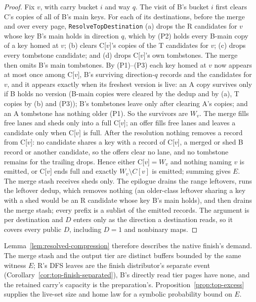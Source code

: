 \documentclass[11pt]{article}
\theoremstyle{definition}
\theoremstyle{remark}
\begin{document}
\begin{proof}
Fix $v$, with carry bucket $i$ and way $q$. The visit of B's bucket $i$
first clears C's copies of all of B's main keys. For each of its
destinations, before the merge and over every page,
\texttt{ResolveTopDestination} (a) drops the R candidates for $v$ whose key
B's main holds in direction $q$, which by (P2) holds every B-main copy of a
key homed at $v$; (b) clears C[$v$]'s copies of the T candidates for $v$;
(c) drops every tombstone candidate; and (d) drops C[$v$]'s own tombstones.
The merge then omits B's main tombstones. By (P1)--(P3) each key homed at
$v$ now appears at most once among C[$v$], B's surviving direction-$q$
records and the candidates for $v$, and it appears exactly when its
freshest version is live: an A copy survives only if B holds no version
(B-main copies were cleared by the dedup and by (a), T copies by (b) and
(P3)); B's tombstones leave only after clearing A's copies; and an A
tombstone has nothing older (P1). So the survivors are $W_v$. The merge
fills free lanes and sheds only into a full C[$v$]; an offer fills free
lanes and leaves a candidate only when C[$v$] is full. After the resolution
nothing removes a record from C[$v$]: no candidate shares a key with a
record of C[$v$], a merged or shed B record or another candidate, so the
offers clear no lane, and no tombstone remains for the trailing drops.
Hence either C[$v$]$=W_v$ and nothing naming $v$ is emitted, or C[$v$] ends
full and exactly $W_v\setminus C[v]$ is emitted; summing gives $E$. The
merge stash receives sheds only. The epilogue drains the range leftovers,
runs the leftover dedup, which removes nothing (an older-class leftover
sharing a key with a shed would be an R candidate whose key B's main
holds), and then drains the merge stash; every prefix is a sublist of the
emitted records. The argument is per destination and $D$ enters only as the
direction a destination reads, so it covers every public $D$, including
$D=1$ and nonbinary maps.
\end{proof}
Lemma~\ref{lem:resolved-compression} therefore describes the native
finish's demand. The merge stash and the output tier are distinct buffers
bounded by the same witness $E$; R's DFS leaves are the finish
distributor's separate event (Corollary~\ref{cor:top-finish-separated}),
B's directly read tier pages have none, and the retained carry's capacity
is the preparation's. Proposition~\ref{prop:top-excess} supplies the
live-set size and home law for a symbolic probability bound on $E$.
\end{document}
